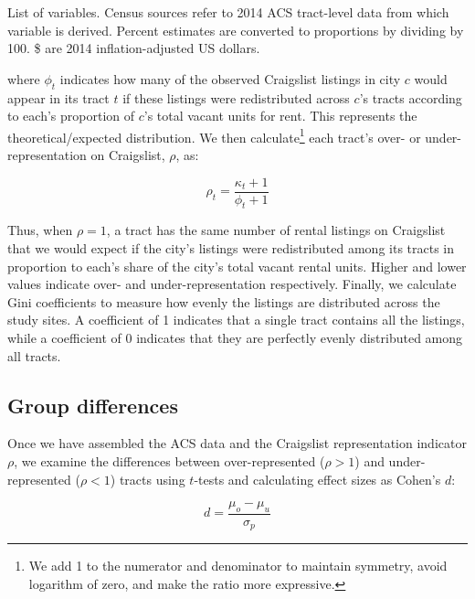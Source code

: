 \documentclass[11pt,onecolumn]{article} %
\begin{document}
\begin{table}[htbp]
	\centering
	\small
	\caption{List of variables. Census sources refer to 2014 ACS tract-level data from which variable is derived. Percent estimates are converted to proportions by dividing by 100. \$ are 2014 inflation-adjusted US dollars.}
	\label{tab:variables_list}
	
\end{table}

where $\phi_t$ indicates how many of the observed Craigslist listings in city $c$ would appear in its tract $t$ if these listings were redistributed across $c$'s tracts according to each's proportion of $c$'s total vacant units for rent. This represents the theoretical/expected distribution. We then calculate\footnote{We add 1 to the numerator and denominator to maintain symmetry, avoid logarithm of zero, and make the ratio more expressive.} each tract's over- or under-representation on Craigslist, $\rho$, as:

\begin{equation}
	\label{eq:representation}
	\rho_t = \frac{\kappa_t + 1}{\phi_t + 1}
\end{equation}

Thus, when $\rho=1$, a tract has the same number of rental listings on Craigslist that we would expect if the city's listings were redistributed among its tracts in proportion to each's share of the city's total vacant rental units. Higher and lower values indicate over- and under-representation respectively. Finally, we calculate Gini coefficients to measure how evenly the listings are distributed across the study sites. A coefficient of 1 indicates that a single tract contains all the listings, while a coefficient of 0 indicates that they are perfectly evenly distributed among all tracts.





\subsection{Group differences}

Once we have assembled the ACS data and the Craigslist representation indicator $\rho$, we examine the differences between over-represented ($\rho>1$) and under-represented ($\rho<1$) tracts using $t$-tests and calculating effect sizes as Cohen's $d$:

\begin{equation}
	\label{eq:cohen_d}
	d = \frac{\mu_o - \mu_u}{\sigma_p}
\end{equation}
\end{document}
